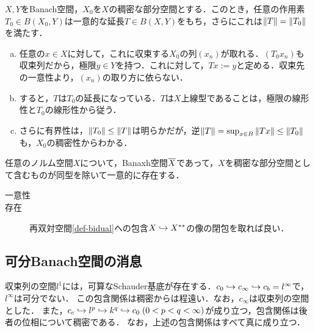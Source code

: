 \documentclass[uplatex,dvipdfmx]{jsreport}
\begin{document}
\begin{proposition}\label{prop-extension-of-operator-on-dense-subset}
    $X,Y$をBanach空間，$X_0$を$X$の稠密な部分空間とする．このとき，任意の作用素$T_0\in B(X_0,Y)$は一意的な延長$T\in B(X,Y)$をもち，さらにこれは$\|T\|=\|T_0\|$を満たす．
\end{proposition}
\begin{Proof}\mbox{}
    \begin{enumerate}[(a)]
        \item 任意の$x\in X$に対して，これに収束する$X_0$の列$(x_n)$が取れる．$(T_0x_n)$も収束列だから，極限$y\in Y$を持つ．これに対して，$Tx:=y$と定める．収束先の一意性より，$(x_n)$の取り方に依らない．
        \item すると，$T$は$T_0$の延長になっている．$T$は$X$上線型であることは，極限の線形性と$T_0$の線形性から従う．
        \item さらに有界性は，$\|T_0\|\le\|T\|$は明らかだが，逆$\|T\|=\sup_{x\in B}\|Tx\|\le\|T_0\|$も，$X_0$の稠密性からわかる．
    \end{enumerate}
\end{Proof}

\begin{proposition}
    任意のノルム空間$X$について，Banaxh空間$\overline{X}$であって，$X$を稠密な部分空間として含むものが同型を除いて一意的に存在する．
\end{proposition}
\begin{Proof}\mbox{}
    \begin{description}
        \item[一意性] 
        \item[存在] 再双対空間\ref{def-bidual}への包含$X\hookrightarrow X^{**}$の像の閉包を取れば良い．
    \end{description}
\end{Proof}


\subsection{可分Banach空間の消息}

\begin{tcolorbox}[colframe=ForestGreen, colback=ForestGreen!10!white,breakable,colbacktitle=ForestGreen!40!white,coltitle=black,fonttitle=\bfseries\sffamily,
title=]
    収束列の空間$l^1$には，可算なSchauder基底が存在する．$c_0\hookrightarrow c_\infty\hookrightarrow c_b=l^\infty$で，$l^\infty$は可分でない．
    この包含関係は稠密からは程遠い．なお，$c_\infty$は収束列の空間とした．
    また，$c_c\hookrightarrow l^p\hookrightarrow k^q\hookrightarrow c_0\;(0<p<q<\infty)$が成り立つ，包含関係は後者の位相について稠密である．
    なお，上述の包含関係はすべて真に成り立つ．
\end{tcolorbox}
\end{document}
